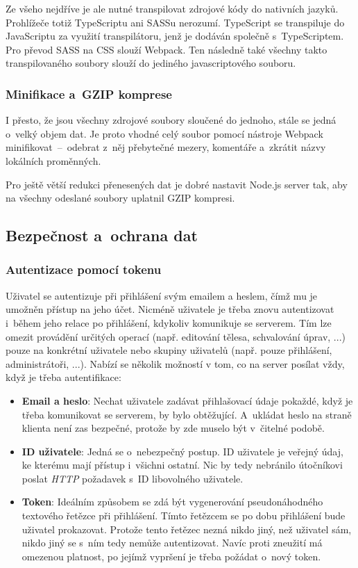 \documentclass[a4paper,12pt]{article}
\begin{document}
Ze všeho nejdříve je ale nutné transpilovat zdrojové kódy do nativních jazyků. Prohlížeče totiž TypeScriptu ani SASSu nerozumí. TypeScript se transpiluje do JavaScriptu za využití transpilátoru, jenž je dodáván společně s~TypeScriptem. Pro převod SASS na CSS slouží Webpack. Ten následně také všechny takto transpilovaného soubory slouží do jediného javascriptového souboru.

\subsubsection{Minifikace a~GZIP komprese}

I přesto, že jsou všechny zdrojové soubory sloučené do jednoho, stále se jedná o~velký objem dat. Je proto vhodné celý soubor pomocí nástroje Webpack minifikovat~–~odebrat z~něj přebytečné mezery, komentáře a~zkrátit názvy lokálních proměnných.

Pro ještě větší redukci přenesených dat je dobré nastavit Node.js server tak, aby na všechny odeslané soubory uplatnil GZIP kompresi.

\subsection{Bezpečnost a~ochrana dat}

\subsubsection{Autentizace pomocí tokenu}

Uživatel se autentizuje při přihlášení svým emailem a heslem, čímž mu je umožněn přístup na jeho účet. Nicméně uživatele je třeba znovu autentizovat i~během jeho relace po přihlášení, kdykoliv komunikuje se serverem. Tím lze omezit provádění určitých operací (např. editování tělesa, schvalování úprav, ...) pouze na konkrétní uživatele nebo skupiny uživatelů (např. pouze přihlášení, administrátoři, ...). Nabízí se několik možností v tom, co na server posílat vždy, když je třeba autentifikace:

\begin{itemize}
\item \textbf{Email a heslo}: Nechat uživatele zadávat přihlašovací údaje pokaždé, když je třeba komunikovat se serverem, by bylo obtěžující. A~ukládat heslo na straně klienta není zas bezpečné, protože by zde muselo být v~čitelné podobě.

\item \textbf{ID uživatele}: Jedná se o~nebezpečný postup. ID uživatele je veřejný údaj, ke kterému mají přístup i~všichni ostatní. Nic by tedy nebránilo útočníkovi poslat \textit{HTTP} požadavek s~ID libovolného uživatele.

\item \textbf{Token}: Ideálním způsobem se zdá být vygenerování pseudonáhodného textového řetězce při přihlášení. Tímto řetězcem se po dobu přihlášení bude uživatel prokazovat. Protože tento řetězec nezná nikdo jiný, než uživatel sám, nikdo jiný se s~ním tedy nemůže autentizovat. Navíc proti zneužití má omezenou platnost, po jejímž vypršení je třeba požádat o~nový token.
\end{itemize}
\end{document}
